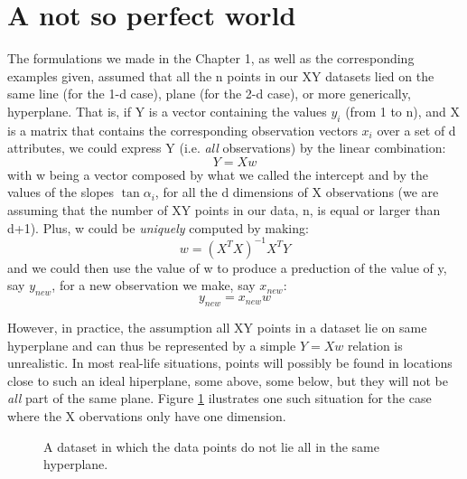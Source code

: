\section{A not so perfect world}
The formulations we made in the Chapter 1, as well as the corresponding examples given, assumed that all the n points in our XY datasets lied on the same line (for the 1-d case), plane (for the 2-d case), or more generically, hyperplane. That is, if Y is a vector containing the values $y_i$ (from 1 to n), and X is a matrix that contains the corresponding observation vectors $x_i$  over a set of d attributes, we could express Y (i.e. \emph{all} observations) by the linear combination:
\begin{equation}
Y = X w 
\end{equation}
with w being a vector composed by what we called the intercept and by the values of the slopes $\tan \alpha_i$, for all the d dimensions of X observations (we are assuming that the number of XY points in our data, n, is equal or larger than d+1). Plus, w could be \emph{uniquely} computed by making:
\begin{equation}
w = (X^T X)^{-1} X^T Y
\label{eq.weight_equation_rectangular_x_matrix}
\end{equation}
and we could then use the value of w to produce a preduction of the value of y, say $y_{new}$, for a new observation we make, say $x_{new}$:
\begin{equation}
y_{new} = x_{new} w 
\end{equation}

However, in practice, the assumption all XY points in a dataset lie on same hyperplane and can thus be represented by a simple $Y = X w$ relation is unrealistic. In most real-life situations, points will possibly be found in locations close to such an ideal hiperplane, some above, some below, but they will not be \emph{all} part of the same plane. Figure \ref{fig.simple_line_many_points} ilustrates one such situation for the case where the X obervations only have one dimension.  
\begin {figure}[H]
\begin{center}
  
\end{center}
\caption{A dataset in which the data points do not lie all in the same hyperplane.}
\label{fig.simple_line_many_points}
\end {figure}

